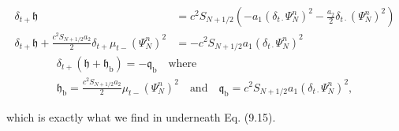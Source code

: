 \documentclass[dvipsnames]{article}
\def\dtd{\delta_{t\cdot}}
\begin{document}
\begin{align}
\delta_{t+}\mathfrak{h} &= c^2 S_{N+1/2}\left(-a_1(\dtd\Psi_N^n)^2 - \frac{a_2}{2}\dtd(\Psi_N^n)^2\right)\\
\delta_{t+}\mathfrak{h} + \frac{c^2S_{N+1/2}a_2}{2}\delta_{t+}\mu_{t-} (\Psi_N^n)^2 &= -c^2S_{N+1/2}a_1(\dtd\Psi_N^n)^2
\end{align}
%
\begin{equation}
    \begin{gathered}
    \delta_{t+}\left(\mathfrak{h} + \mathfrak{h}_\text{b}\right) = -\mathfrak{q}_\text{b} \quad \text{where}\\
    \mathfrak{h}_\text{b} = \frac{c^2S_{N+1/2}a_2}{2}\mu_{t-} (\Psi_N^n)^2 \quad \text{and} \quad
    \mathfrak{q}_\text{b} = c^2S_{N+1/2}a_1(\dtd\Psi_N^n)^2,
    \end{gathered}
\end{equation}

which is exactly what we find in \cite{Bilbao2009} underneath Eq. (9.15).
\end{document}
